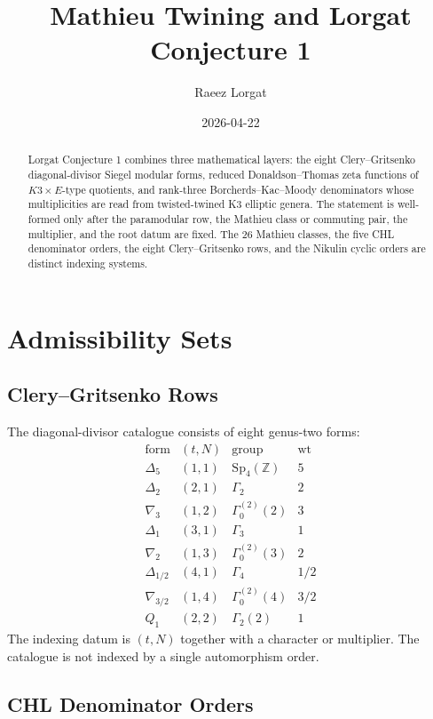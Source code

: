 \documentclass[11pt]{article}
\title{Mathieu Twining and Lorgat Conjecture 1}
\author{Raeez Lorgat}
\date{2026-04-22}
\providecommand{\ZZ}{\mathbb{Z}}
\providecommand{\Sp}{\mathrm{Sp}}
\providecommand{\wt}{\operatorname{wt}}
\providecommand{\Delf}{\Delta_5}
\begin{document}
\maketitle

\begin{abstract}
Lorgat Conjecture 1 combines three mathematical layers: the eight
Clery--Gritsenko diagonal-divisor Siegel modular forms, reduced
Donaldson--Thomas zeta functions of \(K3\times E\)-type quotients, and
rank-three Borcherds--Kac--Moody denominators whose multiplicities are
read from twisted-twined K3 elliptic genera.  The statement is
well-formed only after the paramodular row, the Mathieu class or
commuting pair, the multiplier, and the root datum are fixed.  The 26
Mathieu classes, the five CHL denominator orders, the eight
Clery--Gritsenko rows, and the Nikulin cyclic orders are distinct
indexing systems.
\end{abstract}

\tableofcontents

\section{Admissibility Sets}

\subsection{Clery--Gritsenko Rows}

The diagonal-divisor catalogue consists of eight genus-two forms:
\[
\begin{array}{c|c|c|c}
\text{form} & (t,N) & \text{group} & \wt\\
\hline
\Delf & (1,1) & \Sp_4(\ZZ) & 5\\
\Delta_2 & (2,1) & \Gamma_2 & 2\\
\nabla_3 & (1,2) & \Gamma_0^{(2)}(2) & 3\\
\Delta_1 & (3,1) & \Gamma_3 & 1\\
\nabla_2 & (1,3) & \Gamma_0^{(2)}(3) & 2\\
\Delta_{1/2} & (4,1) & \Gamma_4 & 1/2\\
\nabla_{3/2} & (1,4) & \Gamma_0^{(2)}(4) & 3/2\\
Q_1 & (2,2) & \Gamma_2(2) & 1
\end{array}
\]
The indexing datum is \((t,N)\) together with a character or multiplier.
The catalogue is not indexed by a single automorphism order.

\subsection{CHL Denominator Orders}
\end{document}
